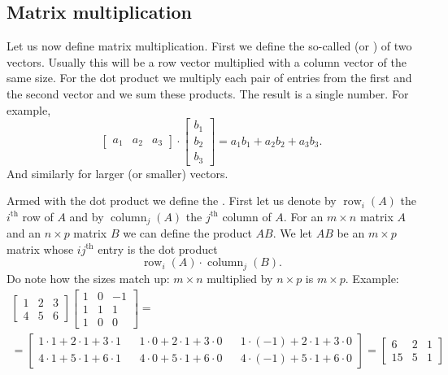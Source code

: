 \documentclass[12pt]{book}
\begin{document}
\subsection{Matrix multiplication}

Let us now define matrix multiplication.  First we define the so-called
\emph{} (or \emph{}) of two vectors.
Usually this will be a row vector multiplied
with a column vector of the same size.  For the dot product we multiply
each pair of entries from the first and the second vector and we sum these
products.  The result is a single number.
For example,
\begin{equation*}
\begin{bmatrix}
a_1 & a_2 & a_3
\end{bmatrix}
\cdot
\begin{bmatrix}
b_1 \\
b_2 \\
b_3
\end{bmatrix}
= a_1 b_1 + a_2 b_2 + a_3 b_3 .
\end{equation*}
And similarly for larger (or smaller) vectors.

Armed with the dot product we define the
\emph{}.
First let us denote by $\operatorname{row}_i(A)$ the $i^{\text{th}}$ row
of $A$ and by
$\operatorname{column}_j(A)$ the $j^{\text{th}}$ column of $A$.
For an $m \times n$ matrix $A$ and an $n \times p$ matrix $B$
we can define the product $AB$.  We let $AB$ be an $m \times p$
matrix whose $ij^{\text{th}}$ entry is the dot product
\begin{equation*}
\operatorname{row}_i(A) \cdot
\operatorname{column}_j(B) .
\end{equation*}
Do note how the sizes match up: $m \times n$ multiplied by $n \times p$ is 
$m \times p$.  Example:
\begin{multline*}
\begin{bmatrix}
1 & 2 & 3 \\
4 & 5 & 6
\end{bmatrix}
\begin{bmatrix}
1 & 0 & -1 \\
1 & 1 & 1 \\
1 & 0 & 0
\end{bmatrix}
= \\ =
\begin{bmatrix}
1\cdot 1 + 2\cdot 1 + 3 \cdot 1 &  &
1\cdot 0 + 2\cdot 1 + 3 \cdot 0 &  &
1\cdot (-1) + 2\cdot 1 + 3 \cdot 0 \\
4\cdot 1 + 5\cdot 1 + 6 \cdot 1 &  &
4\cdot 0 + 5\cdot 1 + 6 \cdot 0 &  &
4\cdot (-1) + 5\cdot 1 + 6 \cdot 0
\end{bmatrix}
=
\begin{bmatrix}
6 & 2 & 1 \\
15 & 5 & 1
\end{bmatrix}
\end{multline*}
\end{document}
